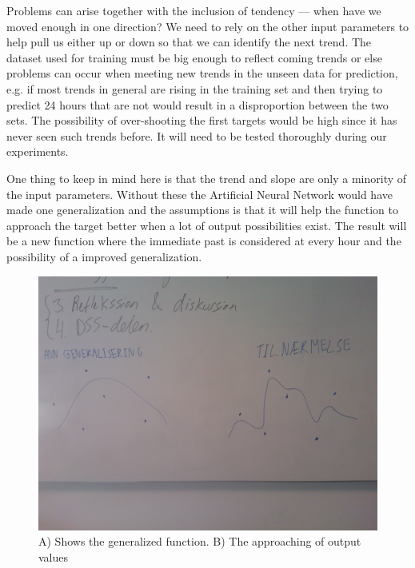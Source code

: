 Problems can arise together with the inclusion of tendency --- when have we moved enough in one direction? We need to rely on the other input parameters to help pull us either up or down so that we can identify the next trend. The dataset used for training must be big enough to reflect coming trends or else problems can occur when meeting new trends in the unseen data for prediction, e.g. if most trends in general are rising in the training set and then trying to predict 24 hours that are not would result in a disproportion between the two sets. The possibility of over-shooting the first targets would be high since it has never seen such trends before. It will need to be tested thoroughly during our experiments. 

One thing to keep in mind here is that the trend and slope are only a minority of the input parameters. Without these the Artificial Neural Network would have made one generalization and the assumptions is that it will help the function to approach the target better when a lot of output possibilities exist. The result will be a new function where the immediate past is considered at every hour and the possibility of a improved generalization.

\begin{figure}[H]
\centering
\includegraphics[width=0.99\linewidth,natwidth=898,natheight=587]{billeder/WP_000057.jpg}
\caption{A) Shows the generalized function. B) The approaching of output values}
\label{fig:WP}
\end{figure}

